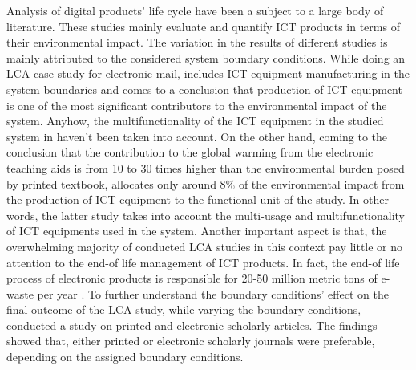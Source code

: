\documentclass[conference]{IEEEtran}
\begin{document}
Analysis of digital products' life cycle have been a subject to a large body of literature. These studies mainly evaluate and quantify ICT products in terms of their environmental impact. The variation in the results of different studies is mainly attributed to the considered system boundary conditions. While doing an LCA case study for electronic mail, \cite{farrant2012environmental} includes ICT equipment manufacturing in the system boundaries and comes to a conclusion that production of ICT equipment is one of the most significant contributors to the environmental impact of the system. Anyhow, the multifunctionality of the ICT equipment in the studied system in \cite{farrant2012environmental} haven't been taken into account. On the other hand, coming to the conclusion that the contribution to the global warming from the electronic teaching aids is from 10 to 30 times higher than the environmental burden posed by printed textbook, \cite{enroth2009} allocates only around 8\% of the environmental impact from the production of ICT equipment to the functional unit of the study. In other words, the latter study takes into account the multi-usage and multifunctionality of ICT equipments used in the system.
Another important aspect is that, the overwhelming majority of conducted LCA studies in this context pay little or no attention to the end-of life management of ICT products. In fact, the end-of life process of electronic products is responsible for 20-50 million metric tons of e-waste per year \cite{koljonen2008environmental}. To further understand the boundary conditions' effect on the final outcome of the LCA study, \cite{gard2002digital} while varying the boundary conditions, conducted a study on printed and electronic scholarly articles. The findings showed that, either printed or electronic scholarly journals were preferable, depending on the assigned boundary conditions.
\end{document}
